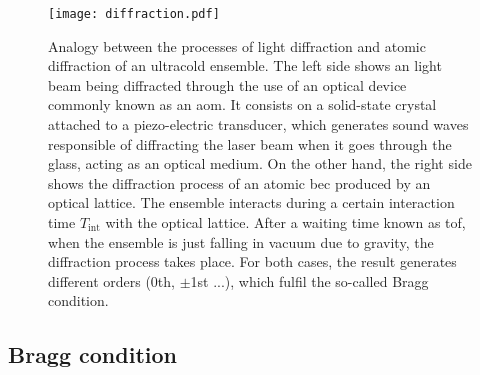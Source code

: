 \begin{figure}[!htbp]\centering
	\texttt{[image: diffraction.pdf]}
	\caption[Analogy between the processes of light diffraction and atomic diffraction of an ultracold ensemble]{Analogy between the processes of light diffraction and atomic diffraction of an ultracold ensemble. The left side shows an light beam being diffracted through the use of an optical device commonly known as an \Acf{aom}. It consists on a solid-state crystal attached to a piezo-electric transducer, which generates sound waves responsible of diffracting the laser beam when it goes through the glass, acting as an optical medium. On the other hand, the right side shows the diffraction process of an atomic \ac{bec} produced by an optical lattice. The ensemble interacts during a certain interaction time $T_{\text{int}}$ with the optical lattice. After a waiting time known as \Acf{tof}, when the ensemble is just falling in vacuum due to gravity, the diffraction process takes place. For both cases, the result generates different orders (0th, $\pm$1st ...), which fulfil the so-called Bragg condition.}\label{fig:diffraction}
\end{figure}

\pagebreak

\subsection{Bragg condition}

